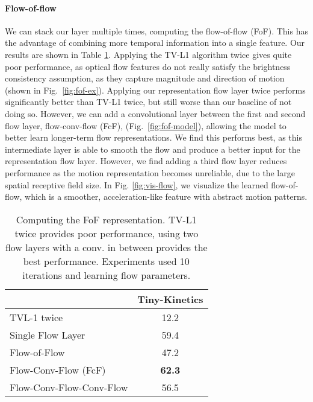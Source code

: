 \documentclass[10pt,twocolumn,letterpaper]{article}
\begin{document}
\vspace{-3pt}
\paragraph{Flow-of-flow} We can stack our layer multiple times, computing the flow-of-flow (FoF). This has the advantage of combining more temporal information into a single feature. Our results are shown in Table \ref{tab:flow-of-flow}. Applying the TV-L1 algorithm twice gives quite poor performance, as optical flow features do not really satisfy the brightness consistency assumption, as they capture magnitude and direction of motion (shown in Fig.~\ref{fig:fof-ex}). Applying our representation flow layer twice performs significantly better than TV-L1 twice, but still worse than our baseline of not doing so. However, we can add a convolutional layer between the first and second flow layer, flow-conv-flow (FcF), (Fig.~\ref{fig:fof-model}), allowing the model to better learn longer-term flow representations. We find this performs best, as this intermediate layer is able to smooth the flow and produce a better input for the representation flow layer. However, we find adding a third flow layer reduces performance as the motion representation becomes unreliable, due to the large spatial receptive field size. In Fig. \ref{fig:vis-flow}, we visualize the learned flow-of-flow, which is a smoother, acceleration-like feature with abstract motion patterns.

\begin{table}
  \caption{Computing the FoF representation. TV-L1 twice provides poor performance, using two flow layers with a conv. in between provides the best performance. Experiments used 10 iterations and learning flow parameters.}
  \label{tab:flow-of-flow}
  \centering
  \begin{tabular}{lc}
    \toprule
                                 &  Tiny-Kinetics \\
    \midrule
    TVL-1 twice                  &  12.2   \\
    Single Flow Layer            &  59.4  \\
    Flow-of-Flow                 &  47.2 \\
    Flow-Conv-Flow (FcF)         &  {\bf 62.3}  \\
    Flow-Conv-Flow-Conv-Flow     &  56.5  \\
    \bottomrule
  \end{tabular}
\end{table}
\end{document}

